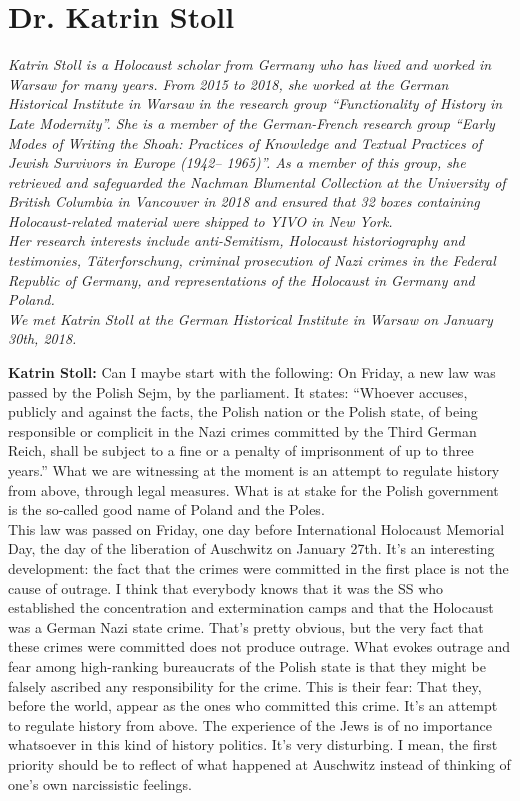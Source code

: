 \section{Dr. Katrin Stoll} 

\textit{Katrin Stoll is a Holocaust scholar from Germany who has lived and worked in Warsaw for many years. From 2015 to 2018, she worked at the German Historical Institute in Warsaw in the research group ``Functionality of History in Late Modernity''. She is a member of the German-French research group ``Early Modes of Writing the Shoah: Practices of Knowledge and Textual Practices of Jewish Survivors in Europe (1942– 1965)''. As a member of this group, she retrieved and safeguarded the Nachman Blumental Collection at the University of British Columbia in Vancouver in 2018 and ensured that 32 boxes containing Holocaust-related material were shipped to YIVO in New York. \\
Her research interests include anti-Semitism, Holocaust historiography and testimonies, Täterforschung, criminal prosecution of Nazi crimes in the Federal Republic of Germany, and representations of the Holocaust in Germany and Poland. \\
We met Katrin Stoll at the German Historical Institute in Warsaw on January 30th, 2018.}\par 
\vspace*{2em}
\textbf{Katrin Stoll:} Can I maybe start with the following: On Friday, a new law was passed by the Polish Sejm, by the parliament. It states: ``Whoever accuses, publicly and against the facts, the Polish nation or the Polish state, of being responsible or complicit in the Nazi crimes committed by the Third German Reich, shall be subject to a fine or a penalty of imprisonment of up to three years.'' What we are witnessing at the moment is an attempt to regulate history from above, through legal measures. What is at stake for the Polish government is the so-called good name of Poland and the Poles.\\ 
This law was passed on Friday, one day before International Holocaust Memorial Day, the day of the liberation of Auschwitz on January 27th. It’s an interesting development: the fact that the crimes were committed in the first place is not the cause of outrage. I think that everybody knows that it was the SS who established the concentration and extermination camps and that the Holocaust was a German Nazi state crime. That’s pretty obvious, but the very fact that these crimes were committed does not produce outrage. What evokes outrage and fear among high-ranking bureaucrats of the Polish state is that they might be falsely ascribed any responsibility for the crime. This is their fear: That they, before the world, appear as the ones who committed this crime. It’s an attempt to regulate history from above. The experience of the Jews is of no importance whatsoever in this kind of history politics. It's very disturbing. I mean, the first priority should be to reflect of what happened at Auschwitz instead of thinking of one’s own narcissistic feelings. 

